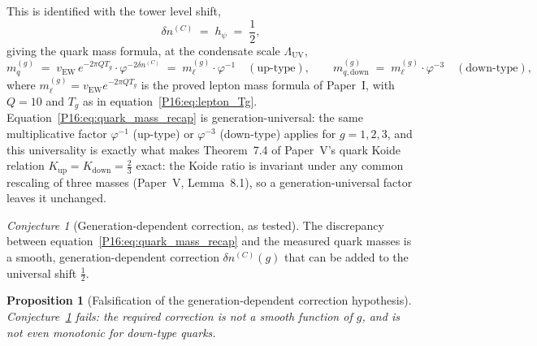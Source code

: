 \documentclass[11pt,a4paper]{article}
\newtheorem{proposition}[theorem]{Proposition}
\theoremstyle{definition}\newtheorem{definition}[theorem]{Definition}
\theoremstyle{remark}
\newtheorem{conjecture}[theorem]{Conjecture}
\theoremstyle{definition}\newtheorem{construction}[theorem]{Construction}
\newcommand{\vp}{\varphi}
\newcommand{\LUV}{\Lambda_{\mathrm{UV}}}
\newcommand{\vEW}{v_{\mathrm{EW}}}
\begin{document}
This is identified with the tower level shift,
\begin{equation}
  \delta n^{(C)} \;=\; h_\psi \;=\; \frac12,
  \label{P16:eq:dn_shift}
\end{equation}
giving the quark mass formula, at the condensate scale $\LUV$,
\begin{equation}
  m_q^{(g)} \;=\; \vEW\,e^{-2\pi QT_g}\cdot\vp^{-2\delta n^{(C)}}
  \;=\; m_\ell^{(g)}\cdot\vp^{-1}
  \quad(\text{up-type}),
  \qquad
  m_{q,\mathrm{down}}^{(g)}
  \;=\; m_\ell^{(g)}\cdot\vp^{-3}
  \quad(\text{down-type}),
  \label{P16:eq:quark_mass_recap}
\end{equation}
where $m_\ell^{(g)}=\vEW e^{-2\pi QT_g}$ is the proved lepton mass
formula of Paper~I, with $Q=10$ and $T_g$ as in
equation~\eqref{P16:eq:lepton_Tg}. Equation~\eqref{P16:eq:quark_mass_recap} is
generation-universal: the same multiplicative factor $\vp^{-1}$
(up-type) or $\vp^{-3}$ (down-type) applies for $g=1,2,3$, and this
universality is exactly what makes Theorem~7.4 of Paper~V's quark
Koide relation $K_{\mathrm{up}}=K_{\mathrm{down}}=\tfrac23$ exact: the
Koide ratio is invariant under any common rescaling of three masses
(Paper~V, Lemma~8.1), so a generation-universal factor leaves
it unchanged.

\begin{conjecture}[Generation-dependent correction, as tested]
\label{P16:conj:colourshift}
The discrepancy between equation~\eqref{P16:eq:quark_mass_recap} and the
measured quark masses is a smooth, generation-dependent correction
$\delta n^{(C)}(g)$ that can be added to the universal shift
$\tfrac12$.
\end{conjecture}

\begin{proposition}[Falsification of the generation-dependent
  correction hypothesis]
\label{P16:prop:colourshift_fail}
Conjecture~\ref{P16:conj:colourshift} fails: the required correction is
not a smooth function of $g$, and is not even monotonic for down-type
quarks.
\end{proposition}
\end{document}
